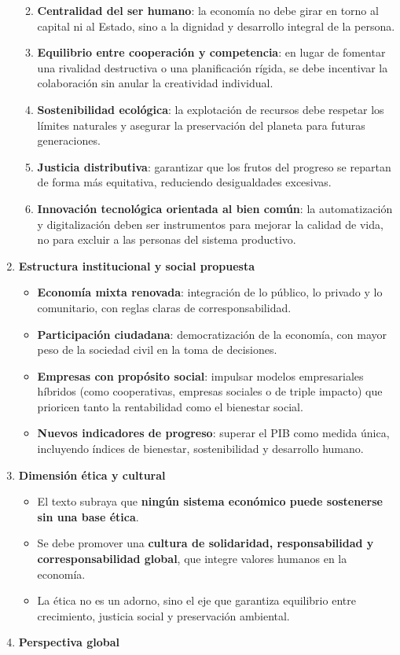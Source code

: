 \documentclass[12pt]{report} %
\providecommand{\tightlist}{%
  \setlength{\itemsep}{0pt}\setlength{\parskip}{0pt}}
\begin{document}
\begin{enumerate}
  \begin{enumerate}
  \def\labelenumii{\arabic{enumii}.}
  \tightlist
  \item
    \textbf{Centralidad del ser humano}: la economía no debe girar en
    torno al capital ni al Estado, sino a la dignidad y desarrollo
    integral de la persona.
  \item
    \textbf{Equilibrio entre cooperación y competencia}: en lugar de
    fomentar una rivalidad destructiva o una planificación rígida, se
    debe incentivar la colaboración sin anular la creatividad
    individual.
  \item
    \textbf{Sostenibilidad ecológica}: la explotación de recursos debe
    respetar los límites naturales y asegurar la preservación del
    planeta para futuras generaciones.
  \item
    \textbf{Justicia distributiva}: garantizar que los frutos del
    progreso se repartan de forma más equitativa, reduciendo
    desigualdades excesivas.
  \item
    \textbf{Innovación tecnológica orientada al bien común}: la
    automatización y digitalización deben ser instrumentos para mejorar
    la calidad de vida, no para excluir a las personas del sistema
    productivo.
  \end{enumerate}
\item
  \textbf{Estructura institucional y social propuesta}

  \begin{itemize}
  \tightlist
  \item
    \textbf{Economía mixta renovada}: integración de lo público, lo
    privado y lo comunitario, con reglas claras de corresponsabilidad.
  \item
    \textbf{Participación ciudadana}: democratización de la economía,
    con mayor peso de la sociedad civil en la toma de decisiones.
  \item
    \textbf{Empresas con propósito social}: impulsar modelos
    empresariales híbridos (como cooperativas, empresas sociales o de
    triple impacto) que prioricen tanto la rentabilidad como el
    bienestar social.
  \item
    \textbf{Nuevos indicadores de progreso}: superar el PIB como medida
    única, incluyendo índices de bienestar, sostenibilidad y desarrollo
    humano.
  \end{itemize}
\item
  \textbf{Dimensión ética y cultural}

  \begin{itemize}
  \tightlist
  \item
    El texto subraya que \textbf{ningún sistema económico puede
    sostenerse sin una base ética}.
  \item
    Se debe promover una \textbf{cultura de solidaridad, responsabilidad
    y corresponsabilidad global}, que integre valores humanos en la
    economía.
  \item
    La ética no es un adorno, sino el eje que garantiza equilibrio entre
    crecimiento, justicia social y preservación ambiental.
  \end{itemize}
\item
  \textbf{Perspectiva global}


\end{enumerate}
\end{document}
